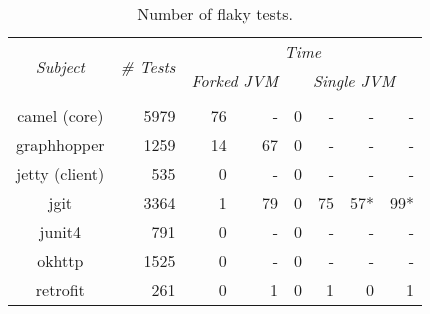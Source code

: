 \begin{table*}[t]
  \centering
  \begin{tabular}{|c|r|r|r|r|r|r|r|}
    \hline
    \multirow{2}{*}{\emph{Subject}} & \multirow{2}{*}{\emph{\# Tests}} &  \multicolumn{6}{c|}{\emph{Time}}\\
    \cline{3-8}
    & & \multicolumn{2}{c|}{\emph{Forked JVM}} & \multicolumn{4}{c|}{\emph{Single JVM}}   \\
    \cline{3-8}
    & & \multicolumn{1}{c|}{\Seq{}} & \multicolumn{1}{c|}{\ParClassSeqMeth{}} & \multicolumn{1}{c|}{\Seq{}} & \multicolumn{1}{c|}{\ParClassSeqMeth{}} & \multicolumn{1}{c|}{\SeqClassParMeth{}} & \multicolumn{1}{c|}{\ParClassParMeth{}}\\     \hline 
    camel (core) & 5979 & 76 & - & 0 & - & - & - \\
    \hline
    graphhopper & 1259 & 14 & 67 & 0 & - & - & - \\
    \hline
    jetty (client) & 535 & 0 & - & 0 & - & - & - \\
    \hline
    jgit & 3364 & 1 & 79 & 0 & 75 & 57* & 99* \\
    \hline
    junit4 & 791 & 0 & - & 0 & - & - & - \\
    \hline
    okhttp & 1525 & 0 & - & 0 & - & - & - \\
    \hline
    retrofit & 261 & 0 & 1 & 0 & 1 & 0 & 1 \\
    \hline
  \end{tabular}
  \caption{\label{table:failures}Number of flaky tests.}
\end{table*}

